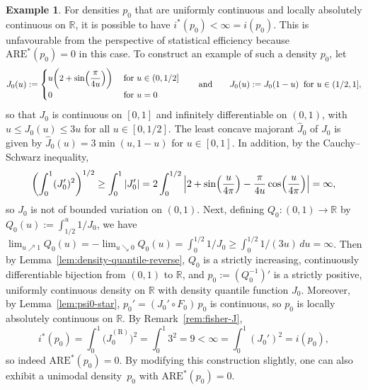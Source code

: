 \documentclass[a4paper]{article}
\newcommand{\R}{\mathbb{R}}
\theoremstyle{definition}
\newtheorem{example}[theorem]{Example}
\begin{document}
\begin{example}
\label{rem:ARE-infinity}
For densities $p_0$ that are uniformly continuous and locally absolutely continuous on $\R$, it is possible to have $i^*(p_0) < \infty = i(p_0)$. This is unfavourable from the perspective of statistical efficiency because $\mathrm{ARE}^*(p_0) = 0$ in this case. To construct an example of such a density $p_0$, let
\[
J_0(u) := 
\begin{cases}
u\biggl(2 + \sin\Bigl(\dfrac{\pi}{4u}\Bigr)\biggr)\;&\text{for } u \in (0,1/2] \\
0 &\text{for }u = 0
\end{cases}
\qquad\text{and}\qquad J_0(u) := J_0(1 - u)\;\;\text{for } u \in (1/2,1],
\]
so that $J_0$ is continuous on $[0,1]$ and infinitely differentiable on $(0,1)$, with $u \leq J_0(u) \leq 3u$ for all $u \in [0,1/2]$. The least concave majorant $\hat{J}_0$ of $J_0$ is given by $\hat{J}_0(u) = 3\min(u, 1 - u)$ for $u \in [0,1]$. In addition, by the Cauchy--Schwarz inequality,
\[
\biggl(\int_0^1(J_0')^2\biggr)^{1/2} \geq \int_0^1 |J_0'| = 2\int_0^{1/2}\,\Bigl|2 + \sin\Bigl(\frac{u}{4\pi}\Bigr) - \frac{\pi}{4u}\cos\Bigl(\frac{u}{4\pi}\Bigr)\Bigr| = \infty,
\]
so $J_0$ is not of bounded variation on $(0,1)$. Next, defining $Q_0 \colon (0,1) \to \R$ by $Q_0(u) := \int_{1/2}^u 1/J_0$, we have $\lim_{u \nearrow 1}Q_0(u) = -\lim_{u \searrow 0}Q_0(u) = \int_0^{1/2} 1/J_0 \geq \int_0^{1/2} 1/(3u)\,du = \infty$. Then by Lemma~\ref{lem:density-quantile-reverse}, $Q_0$ is a strictly increasing, continuously differentiable bijection from $(0,1)$ to $\R$, and $p_0 := (Q_0^{-1})'$ is a strictly positive, uniformly continuous density on $\R$ with density quantile function $J_0$. Moreover, by Lemma~\ref{lem:psi0-star}, $p_0' = (J_0' \circ F_0)\,p_0$ is continuous, so $p_0$ is locally absolutely continuous on $\R$. By Remark~\ref{rem:fisher-J}, 
\[
i^*(p_0) = \int_0^1 \bigl(\hat{J}_0^{(\mathrm{R})}\bigr)^2 = \int_0^1 3^2 = 9 < \infty = \int_0^1 (J_0')^2 = i(p_0),
\]
so indeed $\mathrm{ARE}^*(p_0) = 0$. By modifying this construction slightly, one can also exhibit a unimodal density~$p_0$ with $\mathrm{ARE}^*(p_0) = 0$.
\end{example}
\end{document}
